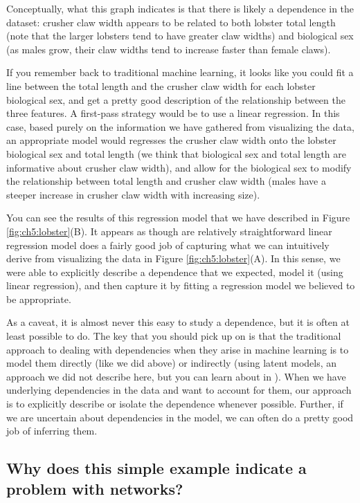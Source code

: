 Conceptually, what this graph indicates is that there is likely a dependence in the dataset: crusher claw width appears to be related to both lobster total length (note that the larger lobsters tend to have greater claw widths) and biological sex (as males grow, their claw widths tend to increase faster than female claws).

If you remember back to traditional machine learning, it looks like you could fit a line between the total length and the crusher claw width for each lobster biological sex, and get a pretty good description of the relationship between the three features. A first-pass strategy would be to use a linear regression. In this case, based purely on the information we have gathered from visualizing the data, an appropriate model would regresses the crusher claw width onto the lobster biological sex and total length (we think that biological sex and total length are informative about crusher claw width), and allow for the biological sex to modify the relationship between total length and crusher claw width (males have a steeper increase in crusher claw width with increasing size). 

You can see the results of this regression model that we have described in Figure \ref{fig:ch5:lobster}(B). It appears as though are relatively straightforward linear regression model does a fairly good job of capturing what we can intuitively derive from visualizing the data in Figure \ref{fig:ch5:lobster}(A). In this sense, we were able to explicitly describe a dependence that we expected, model it (using linear regression), and then capture it by fitting a regression model we believed to be appropriate.

As a caveat, it is almost never this easy to study a dependence, but it is often at least {possible} to do. The key that you should pick up on is that the traditional approach to dealing with dependencies when they arise in machine learning is to model them directly (like we did above) or indirectly (using latent models, an approach we did not describe here, but you can learn about in \cite{Hastie2009}). When we have underlying dependencies in the data and want to account for them, our approach is to explicitly describe or isolate the dependence whenever possible. Further, if we are uncertain about dependencies in the model, we can often do a pretty good job of inferring them.



\subsection{Why does this simple example indicate a problem with networks?}

